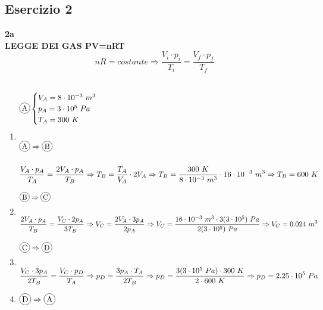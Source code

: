 \documentclass{article}
\newcommand*\circled[1]{\tikz[baseline=(char.base)]{
            \node[shape=circle,draw,inner sep=1.2pt] (char) {#1};}
}
\begin{document}
\pagebreak

\subsection*{Esercizio 2}
\textbf{2a} \\

\hspace*{0.85cm}\textbf{LEGGE DEI GAS PV=nRT} \\
\begin{equation*}
   nR = costante \Rightarrow \frac{V_i \cdot p_i}{T_i} = \frac{V_f \cdot p_f}{T_f} 
\end{equation*} \\

\begin{enumerate}[label=\textbf{.\roman*)}]
    \item \begin{align*}
        &\circled{A} \begin{cases}
            V_A = 8 \cdot 10^{-3}\ m^3 \\
            p_A = 3\cdot 10^5\ Pa \\
            T_A = 300\ K
        \end{cases} \\ \\
        &\circled{A} \Rightarrow \circled{B} \\ \\
            &\frac{V_A \cdot p_A}{T_A} = \frac{2V_A \cdot p_A}{T_B}
            \Rightarrow T_B = \frac{T_A}{V_A} \cdot 2V_A
            \Rightarrow T_B = \frac{300\ K}{8\cdot10^{-3}\ m^3} \cdot 16\cdot10^{-3}\ m^3
            \Rightarrow T_B = 600\ K
    \end{align*}
    \item \begin{align*}
        &\circled{B} \Rightarrow \circled{C} \\ \\
        &\frac{2V_A \cdot p_A}{T_B} = \frac{V_C\cdot2p_A}{3T_B}
        \Rightarrow V_C = \frac{2V_A \cdot 3p_A}{2p_A}
        \Rightarrow V_C = \frac{16\cdot10^{-3}\ m^3 \cdot 3(3\cdot10^5)\ Pa}{2(3\cdot10^5)\ Pa}
        \Rightarrow V_C = 0.024\ m^3
    \end{align*}
    \item \begin{align*}
        &\circled{C} \Rightarrow \circled{D} \\ \\
        &\frac{V_C \cdot 3p_A}{2T_B} = \frac{V_C \cdot p_D}{T_A}
        \Rightarrow p_D = \frac{3p_A \cdot T_A}{2T_B}
        \Rightarrow p_D = \frac{3(3\cdot10^5\ Pa) \cdot 300\ K}{2\cdot 600\ K}
        \Rightarrow p_D = 2.25\cdot10^5\ Pa
    \end{align*}
    \item \hspace{0.85cm}$\circled{D} \Rightarrow \circled{A}$
\end{enumerate}
\end{document}
